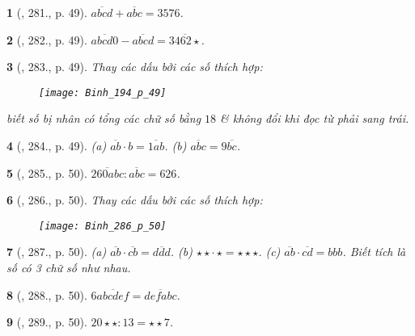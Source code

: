 \documentclass{article}
\newtheorem{baitoan}{}
\begin{document}
\begin{baitoan}[\cite{Binh_Toan_6_tap_1}, 281., p. 49]
	$\overline{abcd} + \overline{abc} = 3576$.
\end{baitoan}

\begin{baitoan}[\cite{Binh_Toan_6_tap_1}, 282., p. 49]
	$\overline{abcd0} - \overline{abcd} = \overline{3462\star}$.
\end{baitoan}

\begin{baitoan}[\cite{Binh_Toan_6_tap_1}, 283., p. 49]
	Thay các dấu {\bf*} bởi các số thích hợp:
	\begin{figure}[H]
		\centering
		\texttt{[image: Binh\_194\_p\_49]}
	\end{figure}
	biết số bị nhân có tổng các chữ số bằng $18$ \& không đổi khi đọc từ phải sang trái.
\end{baitoan}

\begin{baitoan}[\cite{Binh_Toan_6_tap_1}, 284., p. 49]
	(a) $\overline{ab}\cdot b = \overline{1ab}$. (b) $\overline{abc} = 9\overline{bc}$.
\end{baitoan}

\begin{baitoan}[\cite{Binh_Toan_6_tap_1}, 285., p. 50]
	$\overline{260abc}:\overline{abc} = 626$.
\end{baitoan}

\begin{baitoan}[\cite{Binh_Toan_6_tap_1}, 286., p. 50]
	Thay các dấu {\bf*} bởi các số thích hợp:
	\begin{figure}[H]
		\centering
		\texttt{[image: Binh\_286\_p\_50]}
	\end{figure}
\end{baitoan}

\begin{baitoan}[\cite{Binh_Toan_6_tap_1}, 287., p. 50]
	(a) $\overline{ab}\cdot\overline{cb} = \overline{ddd}$. (b) $\star\star\cdot\,\star = \star\star\star$. (c) $\overline{ab}\cdot\overline{cd} = bbb$. Biết tích là số có 3 chữ số như nhau.
\end{baitoan}

\begin{baitoan}[\cite{Binh_Toan_6_tap_1}, 288., p. 50]
	$6\overline{abcdef} = \overline{defabc}$.
\end{baitoan}

\begin{baitoan}[\cite{Binh_Toan_6_tap_1}, 289., p. 50]
	$20\star\star:13 = \star\star7$.
\end{baitoan}
\end{document}
